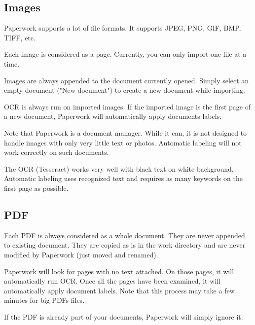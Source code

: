 \documentclass[10pt,a4paper]{article}
\begin{document}


\subsection{Images}

Paperwork supports a lot of file formats. It supports JPEG, PNG, GIF,
BMP, TIFF, etc.

Each image is considered as a page. Currently, you can only import
one file at a time.

Images are always appended to the document currently opened. Simply
select an empty document ("New document") to create a new document while
importing.

OCR is always run on imported images. If the imported image is the
first page of a new document, Paperwork will automatically apply documents
labels.

Note that Paperwork is a document manager. While it can, it is not
designed to handle images with only very little text or photos. Automatic
labeling will not work correctly on such documents.

The OCR (Tesseract) works very well with black text on white background.
Automatic labeling uses recognized text and requires as many keywords
on the first page as possible.

\subsection{PDF}

Each PDF is always considered as a whole document. They are never
appended to existing document. They are copied as is in the work directory
and are never modified by Paperwork (just moved and renamed).

Paperwork will look for pages with no text attached. On those pages,
it will automatically run OCR. Once all the pages have been examined,
it will automatically apply document labels. Note that this process
may take a few minutes for big PDFs files.

If the PDF is already part of your documents, Paperwork will simply
ignore it.
\end{document}
